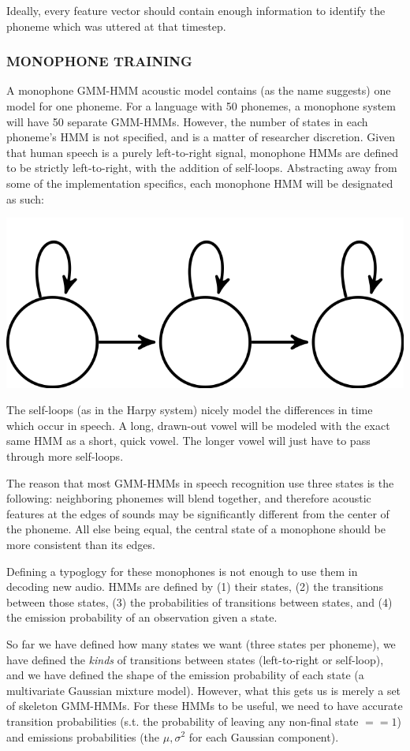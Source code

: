 \documentclass[10pt,a4paper]{article}
\begin{document}
Ideally, every feature vector should contain enough information to identify the phoneme which was uttered at that timestep.


\subsubsection*{MONOPHONE TRAINING}

  A monophone GMM-HMM acoustic model contains (as the name suggests) one model for one phoneme. For a language with 50 phonemes, a monophone system will have 50 separate GMM-HMMs. However, the number of states in each phoneme's HMM is not specified, and is a matter of researcher discretion. Given that human speech is a purely left-to-right signal, monophone HMMs are defined to be strictly left-to-right, with the addition of self-loops. Abstracting away from some of the implementation specifics, each monophone HMM will be designated as such:

\begin{center}
\includegraphics[width=.3\textwidth,keepaspectratio]{figs/3-state-hmm.png}
\end{center}

The self-loops (as in the Harpy system) nicely model the differences in time which occur in speech. A long, drawn-out vowel will be modeled with the exact same HMM as a short, quick vowel. The longer vowel will just have to pass through more self-loops.

The reason that most GMM-HMMs in speech recognition use three states is the following: neighboring phonemes will blend together, and therefore acoustic features at the edges of sounds may be significantly different from the center of the phoneme. All else being equal, the central state of a monophone should be more consistent than its edges.

Defining a typoglogy for these monophones is not enough to use them in decoding new audio. HMMs are defined by (1) their states, (2) the transitions between those states, (3) the probabilities of transitions between states, and (4) the emission probability of an observation given a state.

So far we have defined how many states we want (three states per phoneme), we have defined the \textit{kinds} of transitions between states (left-to-right or self-loop), and we have defined the shape of the emission probability of each state (a multivariate Gaussian mixture model). However, what this gets us is merely a set of skeleton GMM-HMMs. For these HMMs to be useful, we need to have accurate transition probabilities (s.t. the probability of leaving any non-final state $== 1$) and emissions probabilities (the $\mu, \sigma^2$ for each Gaussian component).
\end{document}
